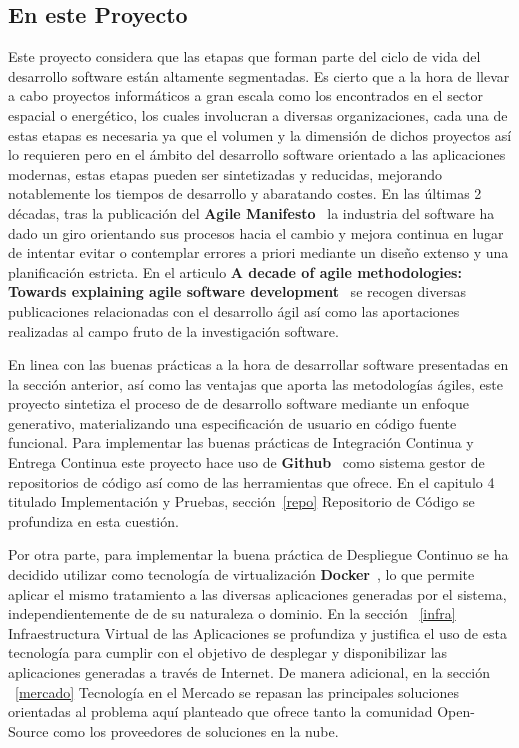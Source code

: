 \documentclass[a4paper,11pt]{book}
\begin{document}
\subsection{En este Proyecto}

Este proyecto considera que las etapas que forman parte del ciclo de vida del desarrollo software están altamente segmentadas. Es cierto que a la hora de llevar a cabo proyectos informáticos a gran escala como los encontrados en el sector espacial o energético, los cuales involucran a diversas organizaciones,  cada una de estas etapas es necesaria ya que el volumen y la dimensión de dichos proyectos así lo requieren pero en el ámbito del desarrollo software orientado a las aplicaciones modernas, estas etapas pueden ser sintetizadas y reducidas, mejorando notablemente los tiempos de desarrollo y abaratando costes.  En las últimas 2 décadas, tras la publicación del \textbf{ Agile Manifesto}~\cite{agile} la industria del software ha dado un giro orientando sus procesos hacia el cambio y mejora continua en lugar de intentar evitar o contemplar errores a priori mediante un diseño extenso y una planificación estricta.  En el articulo \textbf{ A decade of agile methodologies: Towards explaining agile software development}~\cite{decada} se recogen  diversas publicaciones relacionadas con el desarrollo ágil así como las aportaciones realizadas al campo fruto de la investigación software. 


En linea con las buenas prácticas a la hora de desarrollar software presentadas en la sección anterior,  así como las ventajas que aporta las metodologías ágiles, este proyecto sintetiza el proceso de de desarrollo software mediante un enfoque generativo, materializando una especificación de usuario en código fuente funcional.  Para implementar las buenas prácticas de Integración Continua y Entrega Continua este proyecto hace uso de \textbf{Github}~\cite{github} como sistema gestor de repositorios de código así como de las herramientas que ofrece. En el capitulo 4 titulado Implementación y Pruebas, sección~\ref{repo}  Repositorio de Código se profundiza en esta cuestión. 

Por otra parte, para implementar la buena práctica de Despliegue Continuo se ha decidido utilizar como tecnología de virtualización  \textbf{Docker}~\cite{dk}, lo que permite aplicar el mismo tratamiento a las diversas aplicaciones generadas por el sistema, independientemente de de su naturaleza o dominio. En la sección ~\ref{infra} 
Infraestructura Virtual de las Aplicaciones se profundiza y justifica el uso de esta tecnología para cumplir con el objetivo de desplegar y disponibilizar las aplicaciones generadas a través de Internet. De manera adicional, en la sección ~\ref{mercado} Tecnología en el Mercado se repasan las principales soluciones orientadas al problema aquí planteado que ofrece tanto la comunidad Open-Source como los proveedores de soluciones en la nube.   
\end{document}
